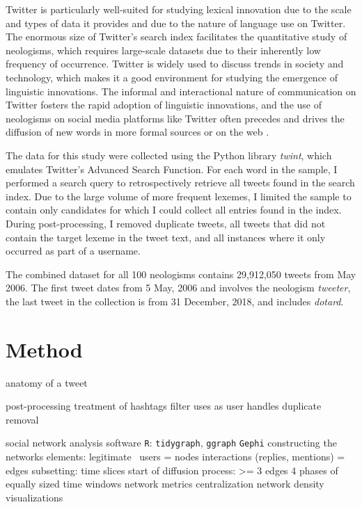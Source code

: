 \documentclass[draft, a4paper, abstract=on]{scrartcl}
\newcommand{\sw}[1]{\texttt{#1}}
\begin{document}
    Twitter is particularly well-suited for studying lexical innovation due to the scale and types of data it provides and due to the nature of language use on Twitter. The enormous size of Twitter's search index facilitates the quantitative study of neologisms, which requires large-scale datasets due to their inherently low frequency of occurrence. Twitter is widely used to discuss trends in society and technology, which makes it a good environment for studying the emergence of linguistic innovations. The informal and interactional nature of communication on Twitter fosters the rapid adoption of linguistic innovations, and the use of neologisms on social media platforms like Twitter often precedes and drives the diffusion of new words in more formal sources or on the web \parencite{Wurschinger2016UsingWeb}.


    The data for this study were collected using the Python library \emph{twint}, which emulates Twitter's Advanced Search Function. For each word in the sample, I performed a search query to retrospectively retrieve all tweets found in the search index. Due to the large volume of more frequent lexemes, I limited the sample to contain only candidates for which I could collect all entries found in the index. During post-processing, I removed duplicate tweets, all tweets that did not contain the target lexeme in the tweet text, and all instances where it only occurred as part of a username.

    The combined dataset for all 100 neologisms contains 29,912,050 tweets from May 2006. The first tweet dates from 5 May, 2006 and involves the neologism \emph{tweeter}, the last tweet in the collection is from 31 December, 2018, and includes \emph{dotard}.


\section{Method}

  anatomy of a tweet

  post-processing
    treatment of hashtags
    filter uses as user handles
    duplicate removal

  social network analysis
    software
      \sw{R}: \sw{tidygraph}, \sw{ggraph}
      \sw{Gephi}
    constructing the networks
      elements: legitimate~\parencite{Goel2016SocialDynamics}
      users = nodes
      interactions (replies, mentions) = edges
    subsetting: time slices
      start of diffusion process: >= 3 edges
      4 phases of equally sized time windows
    network metrics
      centralization
      network density
      visualizations
\end{document}
